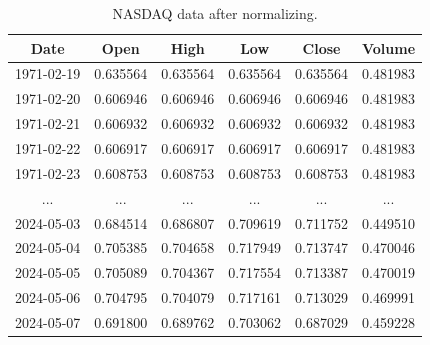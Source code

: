 \begin{table}[H]
	\centering
	\caption{NASDAQ data after normalizing.}
	\begin{tabular}{|c|c|c|c|c|c|}
		\hline
		\textbf{Date} & \textbf{Open} & \textbf{High} & \textbf{Low} & \textbf{Close} & \textbf{Volume} \\
		\hline
		1971-02-19    & 0.635564      & 0.635564      & 0.635564     & 0.635564       & 0.481983        \\
		\hline
		1971-02-20    & 0.606946      & 0.606946      & 0.606946     & 0.606946       & 0.481983        \\
		\hline
		1971-02-21    & 0.606932      & 0.606932      & 0.606932     & 0.606932       & 0.481983        \\
		\hline
		1971-02-22    & 0.606917      & 0.606917      & 0.606917     & 0.606917       & 0.481983        \\
		\hline
		1971-02-23    & 0.608753      & 0.608753      & 0.608753     & 0.608753       & 0.481983        \\
		\hline
		...           & ...           & ...           & ...          & ...            & ...             \\
		\hline
		2024-05-03    & 0.684514      & 0.686807      & 0.709619     & 0.711752       & 0.449510        \\
		\hline
		2024-05-04    & 0.705385      & 0.704658      & 0.717949     & 0.713747       & 0.470046        \\
		\hline
		2024-05-05    & 0.705089      & 0.704367      & 0.717554     & 0.713387       & 0.470019        \\
		\hline
		2024-05-06    & 0.704795      & 0.704079      & 0.717161     & 0.713029       & 0.469991        \\
		\hline
		2024-05-07    & 0.691800      & 0.689762      & 0.703062     & 0.687029       & 0.459228        \\
		\hline
	\end{tabular}
	\label{tab:nor-data}
\end{table}

